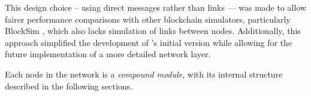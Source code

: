 This design choice -- using direct messages rather than links --- was made to
allow fairer performance comparisons with other blockchain simulators,
particularly BlockSim \cite{blocksim}, which also lacks simulation of links
between nodes. Additionally, this approach simplified the development of
\iblock{}'s initial version while allowing for the future implementation of a
more detailed network layer.

Each node in the network is a \emph{compound module}, with its internal
structure described in the following sections.
